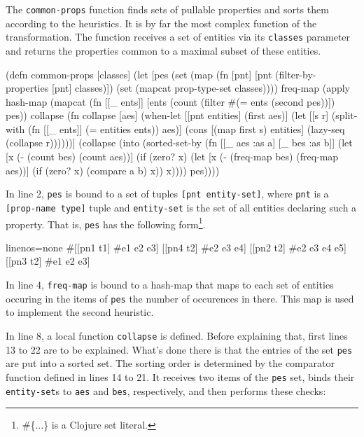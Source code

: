 \documentclass[submission]{eptcs}
\begin{document}
The \verb|common-props| function finds sets of pullable properties and sorts
them according to the heuristics.  It is by far the most complex function of
the transformation.  The function receives a set of entities via its
\verb|classes| parameter and returns the properties common to a maximal subset
of these entities.

\begin{clojurecode}
(defn common-props [classes]
  (let [pes (set (map (fn [pnt] [pnt (filter-by-properties [pnt] classes)])
                      (set (mapcat prop-type-set classes))))
        freq-map (apply hash-map
                        (mapcat (fn [[_ ents]] [ents (count (filter #(= ents (second %
                                                                    pes))])
                                pes))
        collapse (fn collapse [aes]
                   (when-let [[pnt entities] (first aes)]
                     (let [[s r] (split-with (fn [[_ ents]] (= entities ents)) aes)]
                       (cons [(map first s) entities]
                             (lazy-seq (collapse r))))))]
    (collapse (into (sorted-set-by
                     (fn [[_ aes :as a] [_ bes :as b]]
                       (let [x (- (count bes) (count aes))]
                         (if (zero? x)
                           (let [x (- (freq-map bes) (freq-map aes))]
                             (if (zero? x) (compare a b) x))
                           x))))
                    pes))))
\end{clojurecode}

In line 2, \verb|pes| is bound to a set of tuples \verb|[pnt entity-set]|,
where \verb|pnt| is a \verb|[prop-name type]| tuple and \verb|entity-set| is
the set of all entities declaring such a property.  That is, \verb|pes| has the
following form\footnote{\textsf{\#\{...\} is a Clojure set literal.}}.

\begin{clojurecode*}{linenos=none}
#{[[pn1 t1] #{e1 e2 e3}]     [[pn4 t2] #{e2 e3 e4}]
  [[pn2 t2] #{e2 e3 e4 e5}]  [[pn3 t2] #{e1 e2 e3}]}
\end{clojurecode*}

In line 4, \verb|freq-map| is bound to a hash-map that maps to each set of
entities occuring in the items of \verb|pes| the number of occurences in there.
This map is used to implement the second heuristic.

In line 8, a local function \verb|collapse| is defined.  Before explaining
that, first lines 13 to 22 are to be explained.  What's done there is that the
entries of the set \verb|pes| are put into a sorted set.  The sorting order is
determined by the comparator function defined in lines 14 to 21.  It receives
two items of the \verb|pes| set, binds their \verb|entity-set|s to \verb|aes|
and \verb|bes|, respectively, and then performs these checks:
\end{document}
